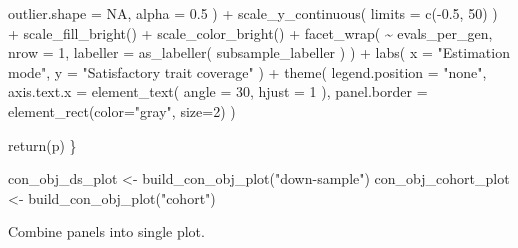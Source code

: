 \documentclass[
]{book}
\newenvironment{Shaded}{\begin{snugshade}}{\end{snugshade}}
\newcommand{\AttributeTok}[1]{\textcolor[rgb]{0.77,0.63,0.00}{#1}}
\newcommand{\ConstantTok}[1]{\textcolor[rgb]{0.00,0.00,0.00}{#1}}
\newcommand{\DecValTok}[1]{\textcolor[rgb]{0.00,0.00,0.81}{#1}}
\newcommand{\FloatTok}[1]{\textcolor[rgb]{0.00,0.00,0.81}{#1}}
\newcommand{\FunctionTok}[1]{\textcolor[rgb]{0.00,0.00,0.00}{#1}}
\newcommand{\NormalTok}[1]{#1}
\newcommand{\OtherTok}[1]{\textcolor[rgb]{0.56,0.35,0.01}{#1}}
\newcommand{\SpecialCharTok}[1]{\textcolor[rgb]{0.00,0.00,0.00}{#1}}
\newcommand{\StringTok}[1]{\textcolor[rgb]{0.31,0.60,0.02}{#1}}
\begin{document}
\begin{Shaded}
\begin{Highlighting}[]
      \AttributeTok{outlier.shape =} \ConstantTok{NA}\NormalTok{,}
      \AttributeTok{alpha =} \FloatTok{0.5}
\NormalTok{    ) }\SpecialCharTok{+}
    \FunctionTok{scale\_y\_continuous}\NormalTok{(}
      \AttributeTok{limits =} \FunctionTok{c}\NormalTok{(}\SpecialCharTok{{-}}\FloatTok{0.5}\NormalTok{, }\DecValTok{50}\NormalTok{)}
\NormalTok{    ) }\SpecialCharTok{+}
    \FunctionTok{scale\_fill\_bright}\NormalTok{() }\SpecialCharTok{+}
    \FunctionTok{scale\_color\_bright}\NormalTok{() }\SpecialCharTok{+}
    \FunctionTok{facet\_wrap}\NormalTok{(}
    \SpecialCharTok{\textasciitilde{}}\NormalTok{ evals\_per\_gen,}
    \AttributeTok{nrow =} \DecValTok{1}\NormalTok{,}
    \AttributeTok{labeller =} \FunctionTok{as\_labeller}\NormalTok{(}
\NormalTok{      subsample\_labeller}
\NormalTok{    )}
\NormalTok{    ) }\SpecialCharTok{+}
    \FunctionTok{labs}\NormalTok{(}
      \AttributeTok{x =} \StringTok{"Estimation mode"}\NormalTok{,}
      \AttributeTok{y =} \StringTok{"Satisfactory trait coverage"}
\NormalTok{    ) }\SpecialCharTok{+}
    \FunctionTok{theme}\NormalTok{(}
      \AttributeTok{legend.position =} \StringTok{"none"}\NormalTok{,}
      \AttributeTok{axis.text.x =} \FunctionTok{element\_text}\NormalTok{(}
        \AttributeTok{angle =} \DecValTok{30}\NormalTok{,}
        \AttributeTok{hjust =} \DecValTok{1}
\NormalTok{      ),}
      \AttributeTok{panel.border =} \FunctionTok{element\_rect}\NormalTok{(}\AttributeTok{color=}\StringTok{"gray"}\NormalTok{, }\AttributeTok{size=}\DecValTok{2}\NormalTok{)}
\NormalTok{    )}

  \FunctionTok{return}\NormalTok{(p)}
\NormalTok{\}}

\NormalTok{con\_obj\_ds\_plot }\OtherTok{\textless{}{-}} \FunctionTok{build\_con\_obj\_plot}\NormalTok{(}\StringTok{"down{-}sample"}\NormalTok{)}
\NormalTok{con\_obj\_cohort\_plot }\OtherTok{\textless{}{-}} \FunctionTok{build\_con\_obj\_plot}\NormalTok{(}\StringTok{"cohort"}\NormalTok{)}
\end{Highlighting}
\end{Shaded}

Combine panels into single plot.
\end{document}
